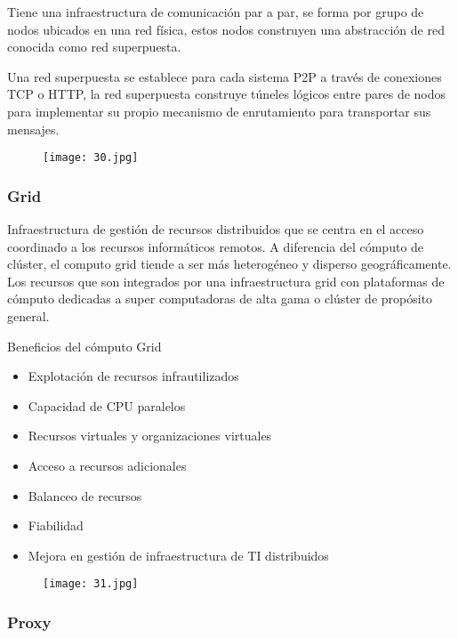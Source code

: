 Tiene una infraestructura de comunicación par a par, se forma por grupo de nodos ubicados en una red física, estos nodos construyen una abstracción de red conocida como red superpuesta.

Una red superpuesta se establece para cada sistema P2P a través de conexiones TCP o HTTP, la red superpuesta construye túneles lógicos entre pares de nodos para implementar su propio mecanismo de enrutamiento para transportar sus mensajes.

\begin{figure}[h!]
		\centering
		{\texttt{[image: 30.jpg]}\par} \vspace{1cm}
\end{figure}

{\raggedright
\subsubsection{\textbf{Grid}}
}

Infraestructura de gestión de recursos distribuidos que se centra en el acceso coordinado a los recursos informáticos remotos. A diferencia del cómputo de clúster, el computo grid tiende a ser más heterogéneo y disperso geográficamente. Los recursos que son integrados por una infraestructura grid con plataformas de cómputo dedicadas a super computadoras de alta gama o clúster de propósito general.

Beneficios del cómputo Grid

\begin{itemize}
	\item Explotación de recursos infrautilizados
	\item Capacidad de CPU paralelos
	\item Recursos virtuales y organizaciones virtuales
	\item Acceso a recursos adicionales
	\item Balanceo de recursos
	\item Fiabilidad
	\item Mejora en gestión de infraestructura de TI distribuidos
\end{itemize}

\begin{figure}[h!]
		\centering
		{\texttt{[image: 31.jpg]}\par} \vspace{1cm}
\end{figure}

{\raggedright
\subsubsection{\textbf{Proxy }}
}

